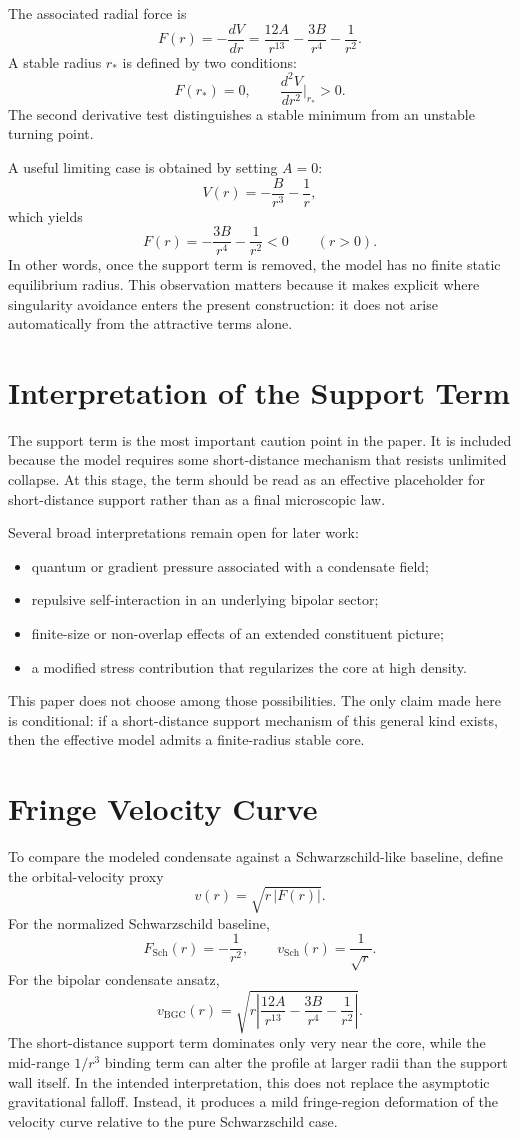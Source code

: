 \documentclass[11pt]{article}
\begin{document}
The associated radial force is
\[
F(r) = -\frac{dV}{dr} = \frac{12A}{r^{13}} - \frac{3B}{r^4} - \frac{1}{r^2}.
\]
A stable radius $r_*$ is defined by two conditions:
\[
F(r_*) = 0, \qquad \frac{d^2V}{dr^2}\Big|_{r_*} > 0.
\]
The second derivative test distinguishes a stable minimum from an unstable turning point.

A useful limiting case is obtained by setting $A=0$:
\[
V(r) = -\frac{B}{r^3} - \frac{1}{r},
\]
which yields
\[
F(r) = -\frac{3B}{r^4} - \frac{1}{r^2} < 0 \qquad (r>0).
\]
In other words, once the support term is removed, the model has no finite static equilibrium radius. This observation matters because it makes explicit where singularity avoidance enters the present construction: it does not arise automatically from the attractive terms alone.

\section{Interpretation of the Support Term}
The support term is the most important caution point in the paper. It is included because the model requires some short-distance mechanism that resists unlimited collapse. At this stage, the term should be read as an effective placeholder for short-distance support rather than as a final microscopic law.

Several broad interpretations remain open for later work:
\begin{itemize}[leftmargin=1.25em]
  \item quantum or gradient pressure associated with a condensate field;
  \item repulsive self-interaction in an underlying bipolar sector;
  \item finite-size or non-overlap effects of an extended constituent picture;
  \item a modified stress contribution that regularizes the core at high density.
\end{itemize}

This paper does not choose among those possibilities. The only claim made here is conditional: if a short-distance support mechanism of this general kind exists, then the effective model admits a finite-radius stable core.

\section{Fringe Velocity Curve}
To compare the modeled condensate against a Schwarzschild-like baseline, define the orbital-velocity proxy
\[
v(r) = \sqrt{r\,|F(r)|}.
\]
For the normalized Schwarzschild baseline,
\[
F_{\mathrm{Sch}}(r) = -\frac{1}{r^2},
\qquad
v_{\mathrm{Sch}}(r) = \frac{1}{\sqrt{r}}.
\]
For the bipolar condensate ansatz,
\[
v_{\mathrm{BGC}}(r) = \sqrt{r\left|\frac{12A}{r^{13}} - \frac{3B}{r^4} - \frac{1}{r^2}\right|}.
\]
The short-distance support term dominates only very near the core, while the mid-range $1/r^3$ binding term can alter the profile at larger radii than the support wall itself. In the intended interpretation, this does not replace the asymptotic gravitational falloff. Instead, it produces a mild fringe-region deformation of the velocity curve relative to the pure Schwarzschild case.
\end{document}
